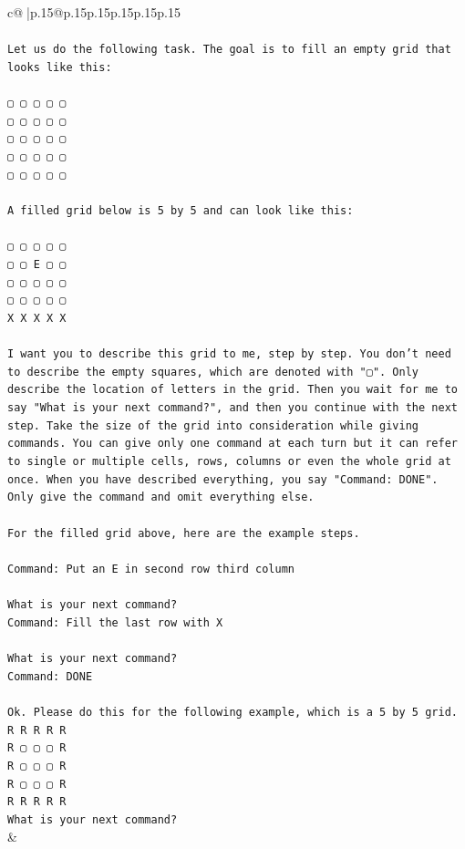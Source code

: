 \documentclass{article}
\begin{document}
{\begin{supertabular}{c@{$\;$}|p{.15\linewidth}@{}p{.15\linewidth}p{.15\linewidth}p{.15\linewidth}p{.15\linewidth}p{.15\linewidth}}
{{{\\ 
\\ 
\texttt{Let us do the following task. The goal is to fill an empty grid that looks like this:} \\
\\ 
\texttt{▢ ▢ ▢ ▢ ▢} \\
\texttt{▢ ▢ ▢ ▢ ▢} \\
\texttt{▢ ▢ ▢ ▢ ▢} \\
\texttt{▢ ▢ ▢ ▢ ▢} \\
\texttt{▢ ▢ ▢ ▢ ▢} \\
\\ 
\texttt{A filled grid below is 5 by 5 and can look like this:} \\
\\ 
\texttt{▢ ▢ ▢ ▢ ▢} \\
\texttt{▢ ▢ E ▢ ▢} \\
\texttt{▢ ▢ ▢ ▢ ▢} \\
\texttt{▢ ▢ ▢ ▢ ▢} \\
\texttt{X X X X X} \\
\\ 
\texttt{I want you to describe this grid to me, step by step. You don't need to describe the empty squares, which are denoted with "▢". Only describe the location of letters in the grid. Then you wait for me to say "What is your next command?", and then you continue with the next step. Take the size of the grid into consideration while giving commands. You can give only one command at each turn but it can refer to single or multiple cells, rows, columns or even the whole grid at once. When you have described everything, you say "Command: DONE". Only give the command and omit everything else.} \\
\\ 
\texttt{For the filled grid above, here are the example steps.} \\
\\ 
\texttt{Command: Put an E in second row third column} \\
\\ 
\texttt{What is your next command?} \\
\texttt{Command: Fill the last row with X} \\
\\ 
\texttt{What is your next command?} \\
\texttt{Command: DONE} \\
\\ 
\texttt{Ok. Please do this for the following example, which is a 5 by 5 grid.} \\
\texttt{R R R R R} \\
\texttt{R ▢ ▢ ▢ R} \\
\texttt{R ▢ ▢ ▢ R} \\
\texttt{R ▢ ▢ ▢ R} \\
\texttt{R R R R R} \\
\texttt{What is your next command?} \\
            }
        }
    }
    & \\ \\


\end{supertabular}}
\end{document}
